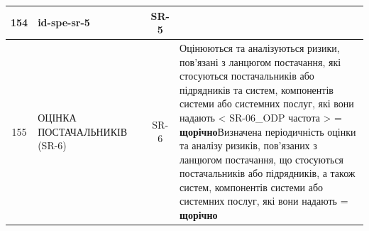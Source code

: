\documentclass[10pt]{article}
\begin{document}
\begin{longtable}{|c|>{\raggedright\arraybackslash}p{2.5cm}|>{\raggedright\arraybackslash}p{4.5cm}|c|>{\raggedright\arraybackslash}p{4.5cm}|}
154 & id-spe-sr-5 &  & SR-5 &  \\ \hline
155 & ОЦІНКА ПОСТАЧАЛЬНИКІВ (SR-6) &  & SR-6 & Оцінюються та аналізуються ризики, пов'язані з ланцюгом постачання, які стосуються постачальників або підрядників та систем, компонентів системи або системних послуг, які вони надають < SR-06\_\allowbreak{}ODP частота > = \textbf{щорічно}\newline Визначена періодичність оцінки та аналізу ризиків, пов'язаних з ланцюгом постачання, що стосуються постачальників або підрядників, а також систем, компонентів системи або системних послуг, які вони надають = \textbf{щорічно} \\ \hline


\end{longtable}
\end{document}
